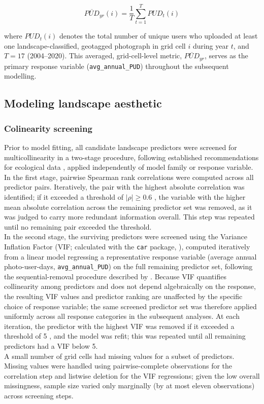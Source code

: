 \documentclass[hidelinks, 11pt]{article}
\begin{document}
\[
\overline{PUD}_{yr}(i) = \frac{1}{T}\sum_{t=1}^{T} PUD_t(i)
\]

where $PUD_t(i)$ denotes the total number of unique users who uploaded at least one landscape-classified, geotagged photograph in grid cell $i$
during year $t$, and $T = 17$ (2004--2020). This averaged, grid-cell-level metric, $\overline{PUD}_{yr}$, serves as the primary response variable (\texttt{avg\_annual\_PUD}) throughout the subsequent modelling.

\subsection{Modeling landscape aesthetic}
\subsubsection{Colinearity screening}

Prior to model fitting, all candidate landscape predictors were screened
for multicollinearity in a two-stage procedure, following established
recommendations for ecological data \citep{zuur2010,dormann2012},
applied independently of model family or response variable.
\\
In the first stage, pairwise Spearman rank correlations were computed
across all predictor pairs. Iteratively, the pair with the highest
absolute correlation was identified; if it exceeded a threshold of
$|\rho| \geq 0.6$ \citep{vaz_digital_2020}, the variable with the higher mean
absolute correlation across the remaining predictor set was removed, as
it was judged to carry more redundant information overall. This step was
repeated until no remaining pair exceeded the threshold.
\\
In the second stage, the surviving predictors were screened using the
Variance Inflation Factor (VIF; calculated with the \texttt{car} package, \citealp{fox2018}), computed iteratively from a linear model regressing a representative response variable (average annual photo-user-days, \texttt{avg\_annual\_PUD}) on the full remaining predictor set, following the sequential-removal procedure described by \citet{zuur2010}. Because VIF quantifies collinearity among predictors and does not depend algebraically on the response, the resulting VIF values and predictor ranking are unaffected by the specific choice of response variable; the same screened predictor set was therefore applied uniformly across all response categories in the subsequent analyses. At each iteration, the predictor with the highest VIF was removed if it exceeded a threshold of 5 \citep{vaz_digital_2020}, and the model was refit; this was repeated until all remaining predictors had a VIF below 5.
\\
A small number of grid cells had missing values for a subset of predictors. Missing values were handled using pairwise-complete observations for the correlation step and listwise deletion for the VIF regressions; given the low overall missingness, sample size varied only marginally (by at most eleven observations) across screening steps.
\end{document}
